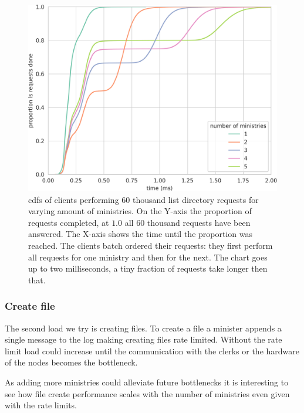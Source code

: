 \begin{figure}[htb]
	\centering
	\includegraphics[height=\textheight]{../results/plots/ls_batch.png}
	\caption{\acp{cdf} of clients performing 60 thousand list directory requests for varying amount of ministries. On the Y-axis the proportion of requests completed, at $1.0$ all 60 thousand requests have been answered. The X-axis shows the time until the proportion was reached. The clients batch ordered their requests: they first perform all requests for one ministry and then for the next. The chart goes up to two milliseconds, a tiny fraction of requests take longer then that.}
	\label{fig:ls_cdf}
\end{figure}

\clearpage{}
\subsubsection*{Create file}
The second load we try is creating files. To create a file a minister appends a single message to the log making creating files rate limited. Without the rate limit load could increase until the communication with the clerks or the hardware of the nodes becomes the bottleneck.%

As adding more ministries could alleviate future bottlenecks it is interesting to see how file create performance scales with the number of ministries even given with the rate limits.

